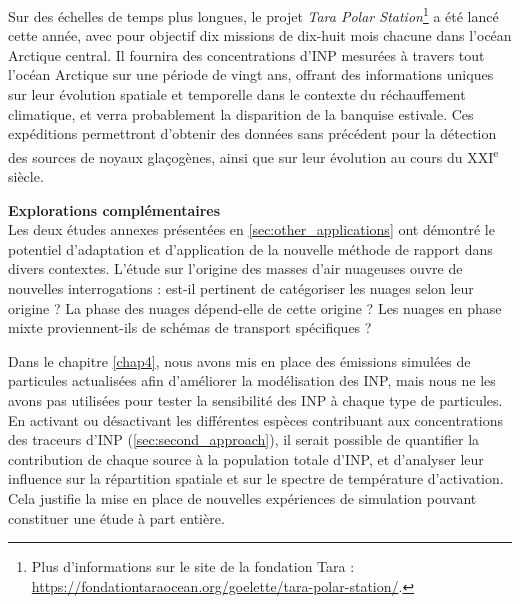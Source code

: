 Sur des échelles de temps plus longues, le projet \textit{Tara Polar Station}\footnote{Plus d’informations sur le site de la fondation Tara : \url{https://fondationtaraocean.org/goelette/tara-polar-station/}.} a été lancé cette année, avec pour objectif dix missions de dix-huit mois chacune dans l’océan Arctique central.  
Il fournira des concentrations d’INP mesurées à travers tout l’océan Arctique sur une période de vingt ans, offrant des informations uniques sur leur évolution spatiale et temporelle dans le contexte du réchauffement climatique, et verra probablement la disparition de la banquise estivale.  
Ces expéditions permettront d’obtenir des données sans précédent pour la détection des sources de noyaux glaçogènes, ainsi que sur leur évolution au cours du XXI\textsuperscript{e} siècle.

\vspace{\baselineskip}
\textbf{Explorations complémentaires}\\
Les deux études annexes présentées en \cref{sec:other_applications} ont démontré le potentiel d’adaptation et d’application de la nouvelle méthode de rapport dans divers contextes.  
L’étude sur l’origine des masses d’air nuageuses ouvre de nouvelles interrogations : est-il pertinent de catégoriser les nuages selon leur origine ?  
La phase des nuages dépend-elle de cette origine ?  
Les nuages en phase mixte proviennent-ils de schémas de transport spécifiques ?

Dans le chapitre \ref{chap4}, nous avons mis en place des émissions simulées de particules actualisées afin d’améliorer la modélisation des INP, mais nous ne les avons pas utilisées pour tester la sensibilité des INP à chaque type de particules.  
En activant ou désactivant les différentes espèces contribuant aux concentrations des traceurs d’INP (\cref{sec:second_approach}), il serait possible de quantifier la contribution de chaque source à la population totale d’INP, et d’analyser leur influence sur la répartition spatiale et sur le spectre de température d’activation.  
Cela justifie la mise en place de nouvelles expériences de simulation pouvant constituer une étude à part entière.

